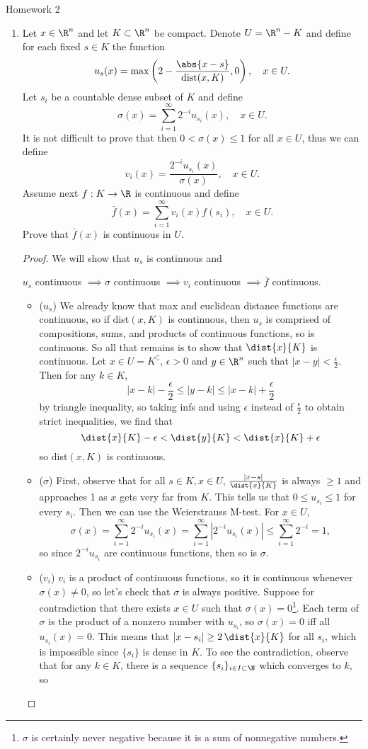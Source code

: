 \documentclass[12pt,letterpaper]{article}
\begin{document}
\pagestyle{fancy}
\begin{center}
{\Large Homework 2}%
\end{center}

\begin{enumerate}
\item Let $x\in\R^n$ and let $K\subset\R^n$ be compact. Denote $U=\R^n-K$ and define for each fixed $s\in K$ the function 
$$u_s(x)=\max\left(2-\frac{\abs{x-s}}{\text{dist}(x,K)},0\right), \quad x\in U.$$
Let $s_i$ be a countable dense subset of $K$ and define 
$$\sigma(x)=\sum_{i=1}^\infty2^{-i}u_{s_i}(x), \quad x\in U.$$
It is not difficult to prove that then $0<\sigma(x)\leq1$ for all $x\in U$, thus we can define 
$$v_i(x)=\frac{2^{-i}u_{s_i}(x)}{\sigma(x)}, \quad x\in U.$$
Assume next $f:K\to\R$ is continuous and define 
$$\bar{f}(x)=\sum_{i=1}^\infty	v_i(x)f(s_i), \quad x\in U.$$
Prove that $\bar{f}(x)$ is continuous in $U$. 
\begin{proof}
We will show that $u_s$ is continuous and 
\begin{center}
$u_s$ continuous $\implies \sigma$ continuous $\implies v_i$ continuous $\implies \bar{f}$ continuous. 
\end{center}
\begin{itemize}
\item ($u_s$) We already know that max and euclidean distance functions are continuous, so if dist$(x,K)$ is continuous, then $u_s$ is comprised of compositions, sums, and products of continuous functions, so is continuous. So all that remains is to show that $\dist{x}{K}$ is continuous. Let $x\in U = K^\complement$, $\epsilon>0$ and $y\in\R^n$ such that $|x-y|<\frac{\epsilon}{2}$. Then for any $k\in K$, 
$$|x-k|-\frac{\epsilon}{2}\leq|y-k|\leq|x-k|+\frac{\epsilon}{2}$$
by triangle inequality, so taking infs and using $\epsilon$ instead of $\frac{\epsilon}{2}$ to obtain strict inequalities, we find that 
$$\dist{x}{K}-\epsilon<\dist{y}{K}<\dist{x}{K}+\epsilon$$
so dist$(x,K)$ is continuous. 
\item ($\sigma$) First, observe that for all $s\in K, x\in U$, $\frac{|x-s|}{\dist{x}{K}}$ is always $\geq 1$ and approaches 1 as $x$ gets very far from $K$. This tells us that $0 \leq u_{s_i} \leq 1$ for every $s_i$. Then we can use the Weierstrauss M-test. For $x\in U$, 
$$\sigma(x)=\sum_{i=1}^\infty2^{-i}u_{s_i}(x)=\sum_{i=1}^\infty|2^{-i}u_{s_i}(x)|\leq \sum_{i=1}^\infty2^{-i}=1,$$
so since $2^{-i}u_{s_i}$ are continuous functions, then so is $\sigma$. 
\item ($v_i$) $v_i$ is a product of continuous functions, so it is continuous whenever $\sigma(x)\neq0$, so let's check that $\sigma$ is always positive. Suppose for contradiction that there exists $x\in U$ such that $\sigma	(x)=0$\footnote{$\sigma$ is certainly never negative because it is a sum of nonnegative numbers.}. Each term of $\sigma$ is the product of a nonzero number with $u_{s_i}$, so $\sigma(x)=0$ iff all $u_{s_i}(x)=0$. This means that $|x-s_i|\geq2\,\dist{x}{K}$ for all $s_i$, which is impossible since $\{s_i\}$ is dense in $K$. To see the contradiction, observe that for any $k\in K$, there is a sequence $\{s_i\}_{i\in I\subset \N}$ which converges to $k$, so 

\end{itemize}
\end{proof}
\end{enumerate}
\end{document}
